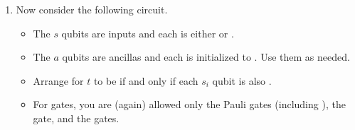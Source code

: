 \documentclass[12pt]{article}
\begin{document}
\begin{enumerate}[font=\bfseries]
\item{} Now consider the following circuit.
\begin{itemize}
    \item The $s$ qubits are inputs and each is either \QZero{} or \QOne{}.
    \item The $a$ qubits are ancillas and each is initialized to \QZero{}.  Use them as needed.
    \item Arrange for $t$ to be \QOne{} if and only if each $s_{i}$ qubit is also \QOne{}.  
    \item For gates, you are (again) allowed only the
    Pauli gates (including \Hadamard{}), the  gate, and the  gates.
\end{itemize}
\begin{center}
\Vskip{-3em}
\end{center}


\end{enumerate}
\end{document}
